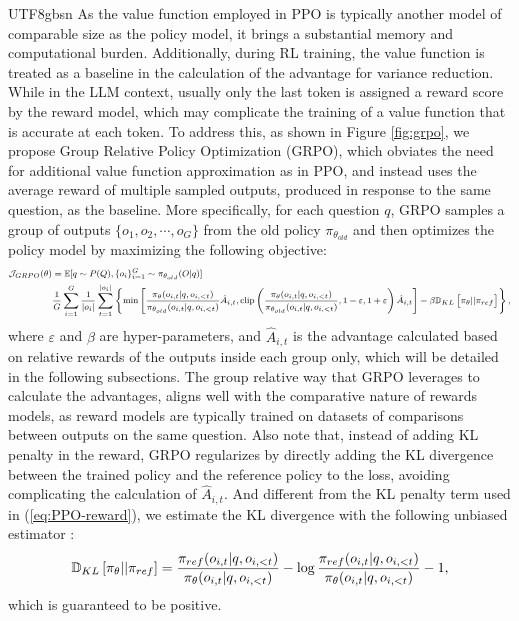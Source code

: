 \documentclass[11pt, a4paper, logo, copyright, nonumbering]{deepseek}
\renewcommand{\epsilon}{\varepsilon}
\begin{document}
\begin{CJK*}{UTF8}{gbsn}
As the value function employed in PPO is typically another model of comparable size as the policy model, it brings a substantial memory and computational burden. Additionally, during RL training, the value function is treated as a baseline in the calculation of the advantage for variance reduction. While in the LLM context, usually only the last token is assigned a reward score by the reward model, which may complicate the training of a value function that is accurate at each token. To address this, as shown in Figure \ref{fig:grpo}, we propose Group Relative Policy Optimization (GRPO), which obviates the need for additional value function approximation as in PPO, and instead uses the average reward of multiple sampled outputs, produced in response to the same question, as the baseline. More specifically, for each question $q$, GRPO samples a group of outputs $\{o_1, o_2, \cdots, o_G\}$  from the old policy  $\pi_{\theta_{old}}$  and then optimizes the policy model by maximizing the following objective:
\begin{equation}
\footnotesize
\begin{split}
    \mathcal{J}_{GRPO}(\theta) &= \mathbb{E}{[q \sim P(Q), \{o_i\}_{i=1}^G \sim \pi_{\theta_{old}}(O|q)]}  \\
    & \frac{1}{G}\sum_{i=1}^G\frac{1}{|o_i|} \sum_{t=1}^{|o_i|} \left\{ \min \left[ \frac{\pi_\theta(o_{i,t} | q, o_{i,<t})}{\pi_{\theta_{old}}(o_{i,t} | q, o_{i,<t})} \hat{A}_{i,t}, \text{clip} \left( \frac{\pi_\theta(o_{i,t} | q, o_{i,<t})}{\pi_{\theta_{old}}(o_{i,t} | q, o_{i,<t})}, 1 - \epsilon, 1 + \epsilon \right)  \hat{A}_{i,t} \right] - \beta \mathbb{D}_{KL}\left[\pi_{\theta} || \pi_{ref}\right]\right\} ,
\end{split}
\label{eq:GRPO-obj}
\end{equation}
where $\epsilon$ and $\beta$ are hyper-parameters, and $\hat{A}_{i,t}$  is the advantage calculated based on relative rewards of the outputs inside each group only, which will be detailed in the following subsections. The group relative way that GRPO leverages to calculate the advantages, aligns well with the comparative nature of rewards models,  as reward models are typically trained on datasets of comparisons between outputs on the same question. Also note that, instead of adding KL penalty in the reward, GRPO regularizes by directly adding the KL divergence between the trained policy and the reference policy to the loss, avoiding complicating the calculation of  $\hat{A}_{i,t}$. And different from the KL penalty term used in (\ref{eq:PPO-reward}), we estimate the KL divergence with the following unbiased estimator \citep{kl_approx}: 
\begin{equation}
\small
    \mathbb{D}_{KL}\left[\pi_{\theta} || \pi_{ref}\right] = \frac{\pi_{ref}(o_{i,t}|q,o_{i,<t})}{\pi_{\theta}(o_{i,t}|q,o_{i,<t})}- \log\frac{\pi_{ref}(o_{i,t}|q,o_{i,<t})}{\pi_{\theta}(o_{i,t}|q,o_{i,<t})} - 1,
\end{equation}
which is guaranteed to be positive. 


\end{CJK*}
\end{document}
